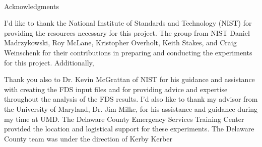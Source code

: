
\renewcommand{\baselinestretch}{2}
\small\normalsize
\hbox{\ }
 
\vspace{-.65in}

\begin{center}
\large{Acknowledgments} 
\end{center} 

\vspace{1ex}

I'd like to thank the National Institute of Standards and Technology (NIST) for providing the resources necessary for this project. The group from NIST  Daniel Madrzykowski, Roy McLane, Kristopher Overholt, Keith Stakes, and Craig Weinschenk for their contributions in preparing and conducting the experiments for this project. Additionally, 

Thank you also to Dr. Kevin McGrattan of NIST for his guidance and assistance with creating the FDS input files and for providing advice and expertise throughout the analysis of the FDS results.
I'd also like to thank my advisor from the University of Maryland, Dr. Jim Milke, for his assistance and guidance during my time at UMD. 
The Delaware County Emergency Services Training Center provided the location and logistical support for these experiments. The Delaware County team was under the direction of Kerby Kerber


